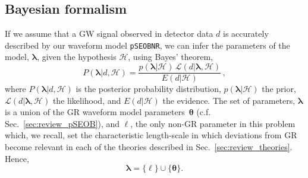 \documentclass[twocolumn,
               prd,
               aps,
               superscriptaddress,
               tightenlines,
               nofootinbib,
               eqsecnum,
               amsfonts,
               amsmath,
               longbibliography]{revtex4-1}
\newcommand{\pSEOB}{\texttt{pSEOBNR}}
\begin{document}
\subsection{Bayesian formalism}
If we assume that a GW signal observed in detector data $d$ is accurately
described by our waveform model \pSEOB{}, we can infer the parameters of the
model, $\bm{\lambda}$, given the hypothesis $\mathcal{H}$, using Bayes' theorem,
%
\begin{equation}
P(\bm{\lambda} \vert d, \mathcal{H}) =
\frac{p(\bm{\lambda} \vert \mathcal{H}) \, \mathcal{L}(d \vert \bm{\lambda},\mathcal{H})}{E(d \vert \mathcal{H})}\,,
\label{eq:bayes}
\end{equation}
%
where $P(\bm{\lambda} \vert d, \mathcal{H})$ is the posterior probability distribution,
$p(\bm{\lambda} \vert \mathcal{H})$ the prior,
$\mathcal{L}(d \vert \bm{\lambda},\mathcal{H})$ the likelihood, and
$E(d \vert \mathcal{H})$ the evidence.
%
The set of parameters, $\bm{\lambda}$ is a union of the GR waveform
model parameters~$\bm{\theta}$ (c.f.  Sec.~\ref{sec:review_pSEOB}), and
$\ell$,  the only non-GR parameter in this problem which, we recall, set
the characteristic length-scale in which deviations from
GR become relevant in each of the theories described in
Sec.~\ref{sec:review_theories}. Hence,
%
\begin{equation}
\bm{\lambda} = \{\ell\} \cup \{\bm{\theta}\}.
\label{eq:def_params}
\end{equation}

\end{document}
